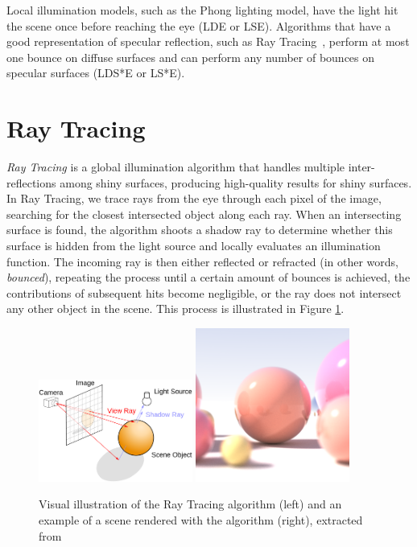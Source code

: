 Local illumination models, such as the Phong lighting model, 
have the light hit the scene once before reaching the eye (LDE or LSE). Algorithms that have a good representation of specular reflection, such as Ray Tracing~\cite{Whitted:1980}, perform at most one bounce on diffuse surfaces and can perform any number of bounces on specular surfaces (LDS*E or LS*E).

\section{Ray Tracing}

\textit{Ray Tracing} \cite{Whitted:1980} is a global illumination algorithm that handles multiple inter-reflections among shiny surfaces, producing 
high-quality results for shiny surfaces. In Ray Tracing, we trace rays from the eye through each pixel of the image, searching for the closest intersected object along each ray. When an intersecting surface is found, the algorithm shoots a shadow ray to determine whether this surface is hidden from the light source and locally evaluates an illumination function. The incoming ray is then either reflected or refracted (in other words, \textit{bounced}), repeating the process until 
a certain amount of bounces is achieved, the contributions of subsequent hits become negligible, or the ray does not intersect any other object in the scene. This process is illustrated in Figure \ref{fig:raytracing}.

\begin{figure}[h]
  \centering
  \includegraphics[width=0.45\textwidth,height=\textheight,keepaspectratio]{images/3_theoretical_foundations/raytracing.png}
  \includegraphics[width=0.45\textwidth,height=\textheight,keepaspectratio]{images/3_theoretical_foundations/raytracingexample.png}
  \caption{Visual illustration of the Ray Tracing algorithm (left) and an example of a scene rendered with the algorithm (right), extracted from \cite{wiki:raytracing}}
  \label{fig:raytracing}
\end{figure}

